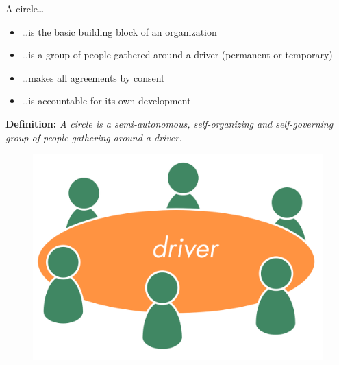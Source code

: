 A circle{\ldots}

\begin{itemize}
\item {\ldots}is the basic building block of an organization

\item {\ldots}is a group of people gathered around a driver (permanent or temporary)

\item {\ldots}makes all agreements by consent

\item {\ldots}is accountable for its own development

\end{itemize}

\textbf{Definition:} \emph{A circle is a semi-autonomous, self-organizing and self-governing group of people gathering around a driver.}

\begin{figure}[htbp]
\centering
\includegraphics[keepaspectratio,width=\textwidth,height=0.75\textheight]{img/circle/circle-driver.png}
\end{figure}

